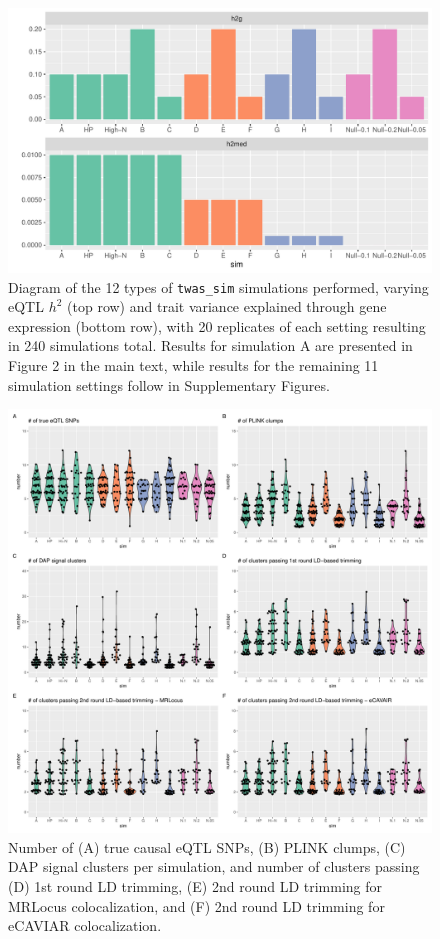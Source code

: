 \documentclass[11pt]{article}
\begin{document}
\begin{figure}[!ht]
  \centering
  \includegraphics[width=.7\textwidth]{figs/sim_types}
  \caption{Diagram of the 12 types of \texttt{twas\_sim} simulations
    performed, varying eQTL $h^2$ (top row) and trait variance explained
    through gene expression (bottom row), with 20 replicates of each
    setting resulting in 240 simulations total. Results for simulation
    A are presented in Figure 2 in the main text, while results for
    the remaining 11 simulation settings follow in Supplementary
    Figures.}
\end{figure}

\begin{figure}[!ht]
  \centering
  \includegraphics[width=\textwidth]{figs/sim_details}
  \caption{Number of (A) true causal eQTL SNPs, (B) PLINK clumps, 
    (C) DAP signal clusters per simulation, and number of clusters
    passing (D) 1st round LD trimming, (E) 2nd round LD trimming for
    MRLocus colocalization, and (F) 2nd round LD trimming for eCAVIAR
    colocalization.}
\end{figure}
\end{document}

